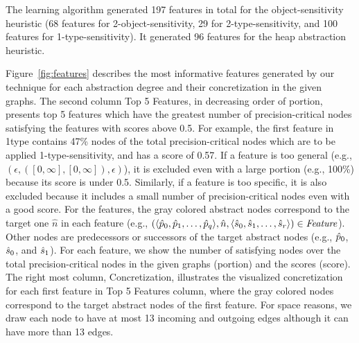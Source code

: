 The learning algorithm generated 197 features in total for the object-sensitivity heuristic (68 features for 2-object-sensitivity, 29 for 2-type-sensitivity, and 100 features for 1-type-sensitivity). It generated 96 features for the heap abstraction heuristic.



Figure~\ref{fig:features} describes the most informative features generated by our technique for each abstraction degree and their concretization in the given graphs.
The second column \textsf{Top 5 Features}, in decreasing order of \textsf{portion}, presents top 5 features which have the greatest number of precision-critical nodes satisfying the features with scores above 0.5.
For example, the first feature in 1type contains 47\% nodes of the total precision-critical nodes which are to be applied 1-type-sensitivity,
and has a score of 0.57.
If a feature is too general (e.g., $(\epsilon, ([0,\infty],[0,\infty]), \epsilon)$), it is excluded even with a large portion (e.g., 100\%)
because its score is under 0.5.
Similarly, if a feature is too specific, it is also excluded because it includes a small number of precision-critical nodes even with a good score.
For the features, the gray colored abstract nodes correspond to the target one $\hat{n}$ in each feature
(e.g., $(\langle {\hat{p}}_0,{\hat{p}}_1,\dots,{\hat{p}}_q \rangle, {\hat{n}}, \langle {\hat{s}}_0,{\hat{s}}_1,\dots,{\hat{s}}_r \rangle) \in {\it Feature}$).
Other nodes are predecessors or successors of the target abstract nodes (e.g., ${\hat{p}}_0$, ${\hat{s}}_0$, and ${\hat{s}}_1$).
For each feature, we show the number of satisfying nodes over the total precision-critical nodes in the given graphs (\textsf{portion}) and the scores (\textsf{score}).
The right most column, \textsf{Concretization}, illustrates the visualized concretization for each first feature in \textsf{Top 5 Features} column,
where the gray colored nodes correspond to the target abstract nodes of the first feature.
For space reasons, we draw each node to have at most 13 incoming and outgoing edges although it can have more than 13 edges.





